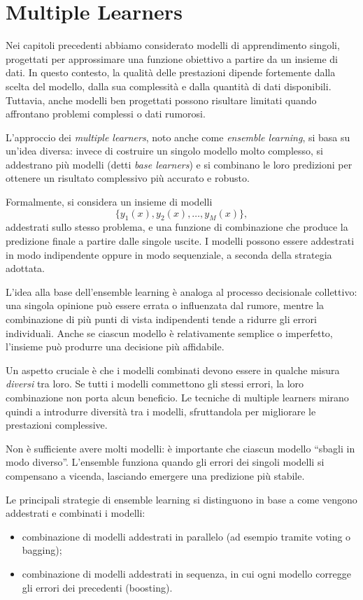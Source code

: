 \documentclass[a4paper,12pt]{report}
\begin{document}
\chapter{Multiple Learners}

Nei capitoli precedenti abbiamo considerato modelli di apprendimento singoli, progettati per approssimare una funzione obiettivo a partire da un insieme di dati. In questo contesto, la qualità delle prestazioni dipende fortemente dalla scelta del modello, dalla sua complessità e dalla quantità di dati disponibili. Tuttavia, anche modelli ben progettati possono risultare limitati quando affrontano problemi complessi o dati rumorosi.

L’approccio dei \emph{multiple learners}, noto anche come \emph{ensemble learning}, si basa su un’idea diversa: invece di costruire un singolo modello molto complesso, si addestrano più modelli (detti \emph{base learners}) e si combinano le loro predizioni per ottenere un risultato complessivo più accurato e robusto.

Formalmente, si considera un insieme di modelli
\[
\{y_1(x), y_2(x), \dots, y_M(x)\},
\]
addestrati sullo stesso problema, e una funzione di combinazione che produce la predizione finale a partire dalle singole uscite. I modelli possono essere addestrati in modo indipendente oppure in modo sequenziale, a seconda della strategia adottata.

L’idea alla base dell’ensemble learning è analoga al processo decisionale collettivo: una singola opinione può essere errata o influenzata dal rumore, mentre la combinazione di più punti di vista indipendenti tende a ridurre gli errori individuali. Anche se ciascun modello è relativamente semplice o imperfetto, l’insieme può produrre una decisione più affidabile.

\medskip
Un aspetto cruciale è che i modelli combinati devono essere in qualche misura \emph{diversi} tra loro. Se tutti i modelli commettono gli stessi errori, la loro combinazione non porta alcun beneficio. Le tecniche di multiple learners mirano quindi a introdurre diversità tra i modelli, sfruttandola per migliorare le prestazioni complessive.

Non è sufficiente avere molti modelli: è importante che ciascun modello “sbagli in modo diverso”. L’ensemble funziona quando gli errori dei singoli modelli si compensano a vicenda, lasciando emergere una predizione più stabile.

\medskip
Le principali strategie di ensemble learning si distinguono in base a come vengono addestrati e combinati i modelli:
\begin{itemize}
    \item combinazione di modelli addestrati in parallelo (ad esempio tramite voting o bagging);
    \item combinazione di modelli addestrati in sequenza, in cui ogni modello corregge gli errori dei precedenti (boosting).
\end{itemize}
\end{document}

